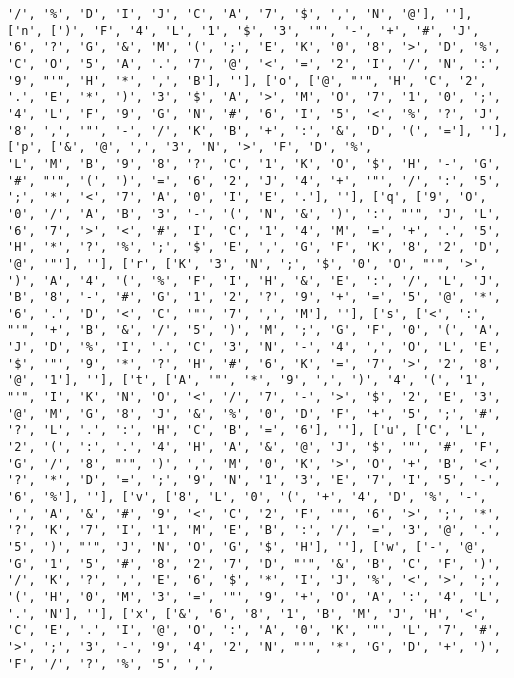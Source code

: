 \documentclass{article}
\begin{document}
\begin{verbatim}
'/', '%', 'D', 'I', 'J', 'C', 'A', '7', '$', ',', 'N', '@'], ''], ['n', [')', 'F', '4', 'L', '1', '$', '3', '"', '-', '+', '#', 'J', '6', '?', 'G', '&', 'M', '(', ';', 'E', 'K', '0', '8', '>', 'D', '%', 'C', 'O', '5', 'A', '.', '7', '@', '<', '=', '2', 'I', '/', 'N', ':', '9', "'", 'H', '*', ',', 'B'], ''], ['o', ['@', "'", 'H', 'C', '2', '.', 'E', '*', ')', '3', '$', 'A', '>', 'M', 'O', '7', '1', '0', ';', '4', 'L', 'F', '9', 'G', 'N', '#', '6', 'I', '5', '<', '%', '?', 'J', '8', ',', '"', '-', '/', 'K', 'B', '+', ':', '&', 'D', '(', '='], ''], ['p', ['&', '@', ',', '3', 'N', '>', 'F', 'D', '%', 
'L', 'M', 'B', '9', '8', '?', 'C', '1', 'K', 'O', '$', 'H', '-', 'G', '#', "'", '(', ')', '=', '6', '2', 'J', '4', '+', '"', '/', ':', '5', ';', '*', '<', '7', 'A', '0', 'I', 'E', '.'], ''], ['q', ['9', 'O', '0', '/', 'A', 'B', '3', '-', '(', 'N', '&', ')', ':', "'", 'J', 'L', '6', '7', '>', '<', '#', 'I', 'C', '1', '4', 'M', '=', '+', '.', '5', 'H', '*', '?', '%', ';', '$', 'E', ',', 'G', 'F', 'K', '8', '2', 'D', '@', '"'], ''], ['r', ['K', '3', 'N', ';', '$', '0', 'O', "'", '>', ')', 'A', '4', '(', '%', 'F', 'I', 'H', '&', 'E', ':', '/', 'L', 'J', 'B', '8', '-', '#', 'G', '1', '2', '?', '9', '+', '=', '5', '@', '*', '6', '.', 'D', '<', 'C', '"', '7', ',', 'M'], ''], ['s', ['<', ':', "'", '+', 'B', '&', '/', '5', ')', 'M', ';', 'G', 'F', '0', '(', 'A', 'J', 'D', '%', 'I', '.', 'C', '3', 'N', '-', '4', ',', 'O', 'L', 'E', '$', '"', '9', '*', '?', 'H', '#', '6', 'K', '=', '7', '>', '2', '8', '@', '1'], ''], ['t', ['A', '"', '*', '9', ',', ')', '4', '(', '1', "'", 'I', 'K', 'N', 'O', '<', '/', '7', '-', '>', '$', '2', 'E', '3', '@', 'M', 'G', '8', 'J', '&', '%', '0', 'D', 'F', '+', '5', ';', '#', '?', 'L', '.', ':', 'H', 'C', 'B', '=', '6'], ''], ['u', ['C', 'L', '2', '(', ':', '.', '4', 'H', 'A', '&', '@', 'J', '$', '"', '#', 'F', 'G', '/', '8', "'", ')', ',', 'M', '0', 'K', '>', 'O', '+', 'B', '<', '?', '*', 'D', '=', ';', '9', 'N', '1', '3', 'E', '7', 'I', '5', '-', '6', '%'], ''], ['v', ['8', 'L', '0', '(', '+', '4', 'D', '%', '-', ',', 'A', '&', '#', '9', '<', 'C', '2', 'F', '"', '6', '>', ';', '*', '?', 'K', '7', 'I', '1', 'M', 'E', 'B', ':', '/', '=', '3', '@', '.', '5', ')', "'", 'J', 'N', 'O', 'G', '$', 'H'], ''], ['w', ['-', '@', 'G', '1', '5', '#', '8', '2', '7', 'D', "'", '&', 'B', 'C', 'F', ')', '/', 'K', '?', ',', 'E', '6', '$', '*', 'I', 'J', '%', '<', '>', ';', '(', 'H', '0', 'M', '3', '=', '"', '9', '+', 'O', 'A', ':', '4', 'L', '.', 'N'], ''], ['x', ['&', '6', '8', '1', 'B', 'M', 'J', 'H', '<', 'C', 'E', '.', 'I', '@', 'O', ':', 'A', '0', 'K', '"', 'L', '7', '#', '>', ';', '3', '-', '9', '4', '2', 'N', "'", '*', 'G', 'D', '+', ')', 'F', '/', '?', '%', '5', ',', 

\end{verbatim}
\end{document}
